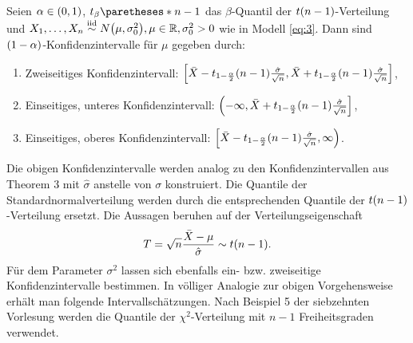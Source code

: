 \documentclass{lecture}
\begin{document}
    \begin{theorem}
        Seien \(\alpha \in \parentheses*{0, 1}\), \(t_\beta\paretheses*{n - 1}\) das \(\beta\)-Quantil der \(t\parentheses*{n - 1}\)-Verteilung und \(X_1, \ldots, X_n \stackrel{\text{iid}}{\sim} N\parentheses*{\mu, \sigma_0^2}, \mu \in \R, \sigma_0^2 > 0\) wie in Modell \eqref{eq:3}.
        Dann sind \(\parentheses*{1 - \alpha}\)-Konfidenzintervalle für \(\mu\) gegeben durch:
        \begin{enumerate}
            \item Zweiseitiges Konfidenzintervall: \(\brackets*{\bar{X} - t_{1 - \frac{\alpha}{2}}\parentheses*{n - 1}\frac{\hat{\sigma}}{\sqrt{n}}, \bar{X} + t_{1 - \frac{\alpha}{2}}\parentheses*{n - 1}\frac{\hat{\sigma}}{\sqrt{n}}}\),
            \item Einseitiges, unteres Konfidenzintervall: \(\left(-\infty, \bar{X} + t_{1 - \frac{\alpha}{2}}\parentheses*{n - 1}\frac{\hat{\sigma}}{\sqrt{n}}\right]\),
            \item Einseitiges, oberes Konfidenzintervall: \(\left[\bar{X} - t_{1 - \frac{\alpha}{2}}\parentheses*{n - 1}\frac{\hat{\sigma}}{\sqrt{n}}, \infty\right)\).
        \end{enumerate}
    \end{theorem}

    Die obigen Konfidenzintervalle werden analog zu den Konfidenzintervallen aus Theorem 3 mit \(\hat{\sigma}\) anstelle von \(\sigma\) konstruiert.
    Die Quantile der Standardnormalverteilung werden durch die entsprechenden Quantile der \(t\parentheses*{n - 1}\)-Verteilung ersetzt.
    Die Aussagen beruhen auf der Verteilungseigenschaft
    \[
        T = \sqrt{n}\frac{\bar{X} - \mu}{\hat{\sigma}} \sim t\parentheses*{n - 1}.
    \]
    Für dem Parameter \(\sigma^2\) lassen sich ebenfalls ein- bzw. zweiseitige Konfidenzintervalle bestimmen.
    In völliger Analogie zur obigen Vorgehensweise erhält man folgende Intervallschätzungen. Nach Beispiel 5 der siebzehnten Vorlesung werden die Quantile der \(\chi^2\)-Verteilung mit \(n - 1\) Freiheitsgraden verwendet.
\end{document}
